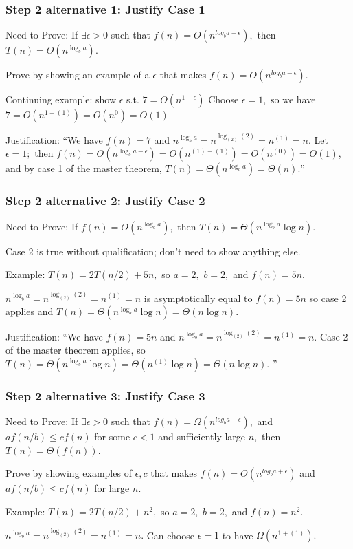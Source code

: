 \documentclass[10pt,aspectratio=169]{beamer}
\begin{document}
 \begin{frame} \frametitle{Step 2 alternative 1: Justify Case 1}
  Need to Prove: If $\exists \epsilon>0$ such that $f(n) = O(n^{log_b a-\epsilon}),$ then $T(n)=\Theta(n^{\log_b a}).$
  \vspace{10pt}

  Prove by showing an example of a $\epsilon$ that makes $f(n) = O(n^{log_b a-\epsilon}).$
  \vspace{10pt}

  Continuing example: show $\epsilon$ s.t. $7 = O(n^{1-\epsilon})$
  Choose $\epsilon=1,$ so we have $7=O(n^{1-(1)}) = O(n^0) = O(1)$
  \vspace{10pt}

  Justification: ``We have $f(n)=7$ and $n^{\log_b a} = n^{\log_{(2)} (2)} = n^{(1)} = n.$ Let $\epsilon=1;$
  then $f(n) = O(n^{\log_b a - \epsilon}) = O(n^{(1)-(1)}) = O(n^{(0)}) = O(1)$, and by case 1 of the master theorem,
  $T(n) = \Theta(n^{\log_b a}) = \Theta(n).$''

\end{frame}

 \begin{frame} \frametitle{Step 2 alternative 2: Justify Case 2}
  Need to Prove: If $f(n) = O(n^{\log_b a}),$ then $T(n)=\Theta(n^{\log_b a} \log n).$
  \vspace{10pt}

  Case 2 is true without qualification; don't need to show anything else.
  \vspace{10pt}

  Example: $T(n) = 2T(n/2) + 5n,$ so $a=2,$ $b=2,$ and $f(n)=5n.$
  \vspace{10pt}

  $n^{\log_b a} = n^{\log_{(2)} (2)} = n^{(1)} = n$ is asymptotically equal to $f(n)=5n$ so case 2 applies
  and $T(n)=\Theta(n^{\log_b a} \log n) = \Theta(n \log n).$
  \vspace{10pt}

 Justification: ``We have $f(n)=5n$ and $n^{\log_b a} = n^{\log_{(2)} (2)} = n^{(1)} = n.$ Case 2 of the
 master theorem applies, so $T(n)=\Theta(n^{\log_b a} \log n) = \Theta(n^{(1)} \log n) = \Theta(n \log n).$ ''
 \end{frame}


 \begin{frame} \frametitle{Step 2 alternative 3: Justify Case 3}
  Need to Prove: If $\exists \epsilon>0$ such that $f(n) = \Omega(n^{log_b a+\epsilon}),$
  and $a f(n/b) \leq cf(n)$ for some $c<1$ and sufficiently large $n,$
  then $T(n)=\Theta(f(n)).$
  \vspace{10pt}

  Prove by showing examples of $\epsilon, c$ that makes $f(n) = O(n^{log_b a+\epsilon})$
  and $a f(n/b) \leq cf(n)$ for large $n$.
  \vspace{10pt}

  Example: $T(n) = 2T(n/2) + n^2,$ so $a=2,$ $b=2,$ and $f(n)=n^2.$
  \vspace{10pt}

  $n^{\log_b a} = n^{\log_{(2)} (2)} = n^{(1)} = n.$ Can choose $\epsilon=1$ to have $\Omega(n^{1+(1)}).$
  \vspace{10pt}
\end{frame}
\end{document}
